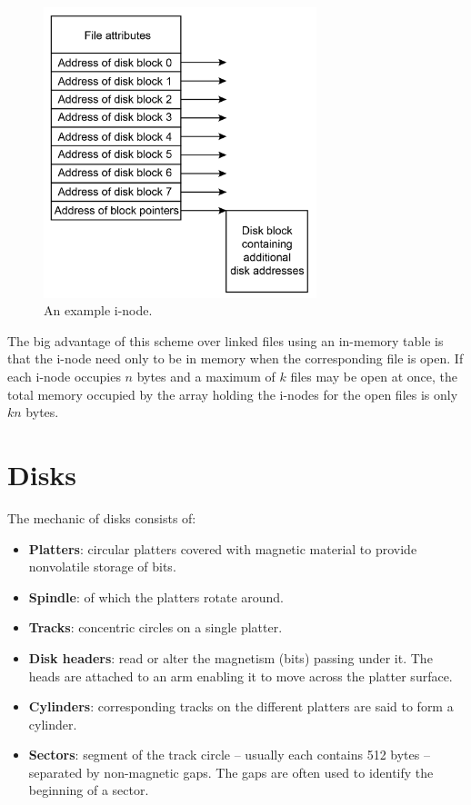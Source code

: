 \documentclass[11pt,a4paper]{article}
\begin{document}
\begin{figure}[h!]
	\centering
		\includegraphics[width=300px]{img/inode-01.png}
	\caption{An example i-node.}
\end{figure}

The big advantage of this scheme over linked files using an in-memory table is that the i-node need only to be in memory when the corresponding file is open. If each i-node occupies $n$ bytes and a maximum of $k$ files may be open at once, the total memory occupied by the array holding the i-nodes for the open files is only $kn$ bytes. 

\section{Disks}
The mechanic of disks consists of:
\begin{itemize}
\item{\textbf{Platters}: circular platters covered with magnetic material to provide nonvolatile storage of bits.}
\item{\textbf{Spindle}: of which the platters rotate around.}
\item{\textbf{Tracks}: concentric circles on a single platter.}
\item{\textbf{Disk headers}: read or alter the magnetism (bits) passing under it. The heads are attached to an arm enabling it to move across the platter surface.}
\item{\textbf{Cylinders}: corresponding tracks on the different platters are said to form a cylinder.}
\item{\textbf{Sectors}: segment of the track circle -- usually each contains 512 bytes -- separated by non-magnetic gaps. The gaps are often used to identify the beginning of a sector.}
\end{itemize}
\end{document}
